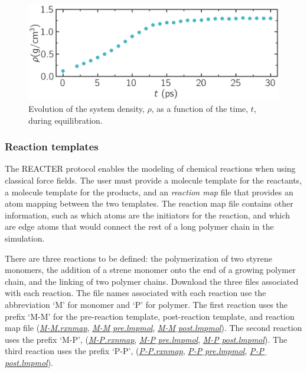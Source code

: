 \documentclass[9pt,tutorial]{livecoms}
\newcommand{\filepath}{https://raw.githubusercontent.com/lammpstutorials/lammpstutorials-article/main/files/}
\begin{document}
\begin{figure}
\centering
\includegraphics[width=\linewidth]{REACT-mixing}
\caption{Evolution of the system density, $\rho$, as a function of the
time, $t$, during equilibration.}
\label{fig:evolution-density}
\end{figure}

\subsubsection{Reaction templates}

The REACTER protocol enables the modeling of chemical reactions when using
classical force fields.  The user must provide a molecule template for the reactants,
a molecule template for the products, and an \textit{reaction map} file that
provides an atom mapping between the two templates.  The reaction map file contains
other information, such as which atoms are the initiators for the reaction, and which
are edge atoms that would connect the rest of a long polymer chain in the simulation.

There are three reactions to be defined: the polymerization of two styrene monomers,
the addition of a strene monomer onto the end of a growing polymer chain, and the
linking of two polymer chains.  Download the three files associated with each reaction.
The file names associated with each reaction use the abbreviation `M' for monomer and `P'
for polymer.  The first reaction uses the prefix `M-M' for the pre-reaction template, post-reaction
template, and reaction map file (\href{\filepath tutorial8/M-M.rxnmap}{\textit{M-M.rxnmap}},
\href{\filepath tutorial8/M-M_pre.lmpmol}{\textit{M-M$\_$pre.lmpmol}},
\href{\filepath tutorial8/M-M_post.lmpmol}{\textit{M-M$\_$post.lmpmol}}).
The second reaction uses the prefix `M-P', (\href{\filepath tutorial8/M-P.rxnmap}{\textit{M-P.rxnmap}},
\href{\filepath tutorial8/M-P_pre.lmpmol}{\textit{M-P$\_$pre.lmpmol}},
\href{\filepath tutorial8/M-P_post.lmpmol}{\textit{M-P$\_$post.lmpmol}}).
The third reaction uses the prefix `P-P', (\href{\filepath tutorial8/P-P.rxnmap}{\textit{P-P.rxnmap}},
\href{\filepath tutorial8/P-P_pre.lmpmol}{\textit{P-P$\_$pre.lmpmol}},
\href{\filepath tutorial8/P-P_post.lmpmol}{\textit{P-P$\_$post.lmpmol}}).
\end{document}
